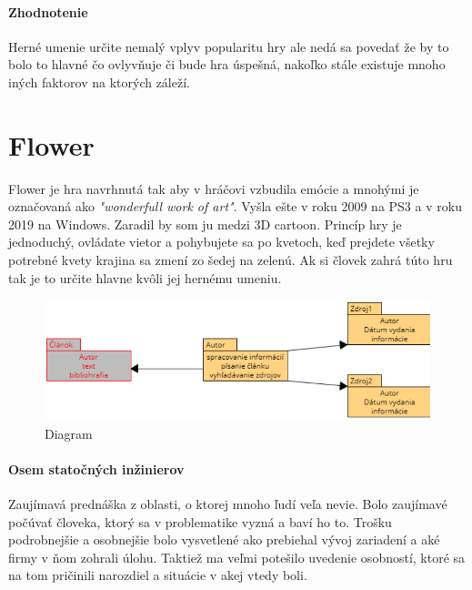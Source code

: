\documentclass[10pt,twoside,slovak,a4paper]{article}
\begin{document}
\paragraph{Zhodnotenie}
Herné umenie určite nemalý vplyv popularitu hry ale nedá sa povedať že by to bolo to hlavné čo ovlyvňuje či bude hra úspešná, nakoľko stále existuje mnoho iných faktorov na ktorých záleží. 

\section{Flower}
\cite{8944678}
Flower je hra  navrhnutá tak aby v hráčovi vzbudila emócie a mnohými je označovaná ako \emph{"wonderfull work of art"}. Vyšla ešte v roku 2009 na PS3 a v roku 2019 na Windows. Zaradil by som ju medzi 3D cartoon. Princíp hry je jednoduchý, ovládate vietor a pohybujete sa po kvetoch, keď prejdete všetky potrebné kvety krajina sa zmení zo šedej na zelenú. Ak si človek zahrá túto hru tak je to určite hlavne kvôli jej hernému umeniu.






















\begin{figure}[!ht]
\begin{center}
\includegraphics[width=12cm]{diagram novy.png}
\caption{Diagram}
\end{center}
\end{figure}

\paragraph{Osem statočných inžinierov}
Zaujímavá prednáška z oblasti, o ktorej mnoho ľudí veľa nevie. Bolo zaujímavé počúvať človeka, ktorý sa v problematike vyzná a baví ho to. Trošku podrobnejšie a osobnejšie bolo vysvetlené ako prebiehal vývoj zariadení a aké firmy v ňom zohrali úlohu. Taktiež ma veľmi potešilo uvedenie osobností, ktoré sa na tom pričinili narozdiel a situácie v akej vtedy boli.
\end{document}
